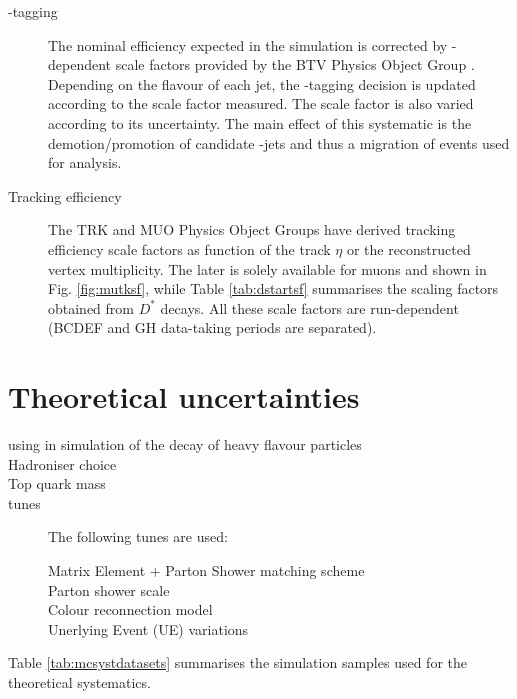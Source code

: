 \begin{description}
\item[\cPqb-tagging] The nominal efficiency expected in the simulation is corrected by \pt-dependent scale factors provided by the BTV Physics Object Group \cite{twiki:BTV}. Depending on the flavour of each jet, the \cPqb-tagging decision is updated according to the scale factor measured. The scale factor is also varied according to its uncertainty. The main effect of this systematic is the demotion/promotion of candidate \cPqb-jets and thus a migration of events used for analysis.

\item[Tracking efficiency]
The TRK and MUO Physics Object Groups have derived tracking efficiency scale factors as function of the track $\eta$ or the reconstructed vertex multiplicity. The later is solely available for muons and shown in Fig. \ref{fig:mutksf}, while Table \ref{tab:dstartsf} summarises the scaling factors obtained from $D^*$ decays. All these scale factors are run-dependent (BCDEF and GH data-taking periods are separated).
\end{description}

\section{Theoretical uncertainties}
\begin{description}
\item[using \EVTGEN in simulation of the decay of heavy flavour particles]
\item[Hadroniser choice] 
\item[Top quark mass] 
\item[\PYTHIA tunes] The following \PYTHIA tunes are used:
  \begin{description}
  \item[Matrix Element + Parton Shower matching scheme] 
  \item[Parton shower scale] 
  \item[Colour reconnection model] 
  \item[Unerlying Event (UE) variations] 
  \end{description}
\end{description}

Table \ref{tab:mcsystdatasets} summarises the simulation samples used for the theoretical systematics.

